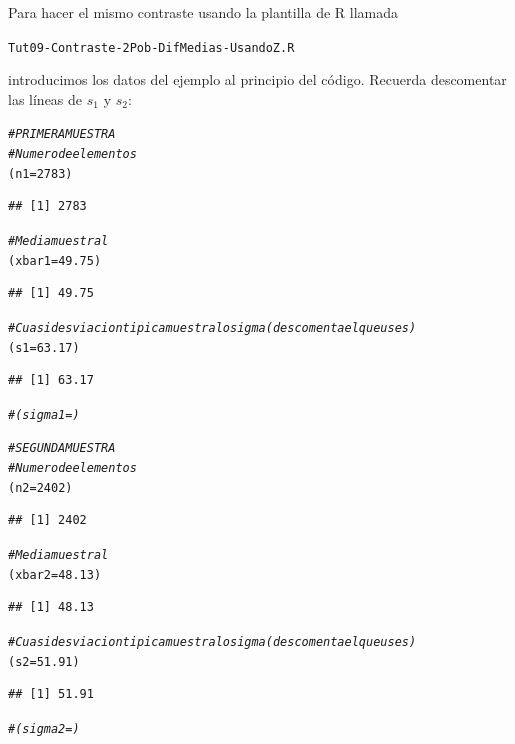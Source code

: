 \documentclass[10pt,a4paper]{article}\usepackage[]{graphicx}\usepackage[]{color}
\makeatletter
\newcommand{\hlnum}[1]{\textcolor[rgb]{0.686,0.059,0.569}{#1}}%
\newcommand{\hlcom}[1]{\textcolor[rgb]{0.678,0.584,0.686}{\textit{#1}}}%
\newcommand{\hlstd}[1]{\textcolor[rgb]{0.345,0.345,0.345}{#1}}%
\newcommand{\hlkwb}[1]{\textcolor[rgb]{0.69,0.353,0.396}{#1}}%
\newenvironment{kframe}{%
 \def\at@end@of@kframe{}%
 \ifinner\ifhmode%
  \def\at@end@of@kframe{\end{minipage}}%
  \begin{minipage}{\columnwidth}%
 \fi\fi%
 \def\FrameCommand##1{\hskip\@totalleftmargin \hskip-\fboxsep
 \colorbox{shadecolor}{##1}\hskip-\fboxsep
     \hskip-\linewidth \hskip-\@totalleftmargin \hskip\columnwidth}%
 \MakeFramed {\advance\hsize-\width
   \@totalleftmargin\z@ \linewidth\hsize
   \@setminipage}}%
 {\par\unskip\endMakeFramed%
 \at@end@of@kframe}
\newenvironment{knitrout}{}{} %
\newcounter {cont01}
\makeatother
\begin{document}
{\begin{enumerate}
    Para hacer el mismo contraste usando la plantilla de R llamada

     \begin{center}
     {\tt Tut09-Contraste-2Pob-DifMedias-UsandoZ.R}
     \end{center}
     introducimos los datos del ejemplo al principio del código. Recuerda descomentar las líneas de $s_1$ y $s_2$:
\begin{knitrout}
\color{fgcolor}\begin{kframe}
\begin{alltt}
  \hlcom{# PRIMERA MUESTRA}
  \hlcom{# Numero de elementos}
   \hlstd{(n1} \hlkwb{=} \hlnum{2783}\hlstd{)}
\end{alltt}
\begin{verbatim}
## [1] 2783
\end{verbatim}
\begin{alltt}
  \hlcom{# Media muestral}
   \hlstd{(xbar1} \hlkwb{=} \hlnum{49.75}\hlstd{)}
\end{alltt}
\begin{verbatim}
## [1] 49.75
\end{verbatim}
\begin{alltt}
  \hlcom{# Cuasidesviacion tipica muestral o sigma (descomenta el que uses)}
   \hlstd{(s1} \hlkwb{=} \hlnum{63.17}\hlstd{)}
\end{alltt}
\begin{verbatim}
## [1] 63.17
\end{verbatim}
\begin{alltt}
   \hlcom{#(sigma1 = )}


  \hlcom{# SEGUNDA MUESTRA}
  \hlcom{# Numero de elementos}
   \hlstd{(n2} \hlkwb{=} \hlnum{2402}\hlstd{)}
\end{alltt}
\begin{verbatim}
## [1] 2402
\end{verbatim}
\begin{alltt}
  \hlcom{# Media muestral}
   \hlstd{(xbar2} \hlkwb{=} \hlnum{48.13}\hlstd{)}
\end{alltt}
\begin{verbatim}
## [1] 48.13
\end{verbatim}
\begin{alltt}
  \hlcom{# Cuasidesviacion tipica muestral o sigma (descomenta el que uses)}
   \hlstd{(s2} \hlkwb{=} \hlnum{51.91}\hlstd{)}
\end{alltt}
\begin{verbatim}
## [1] 51.91
\end{verbatim}
\begin{alltt}
   \hlcom{#(sigma2 = )}


\end{alltt}
\end{kframe}
\end{knitrout}
\end{enumerate}}
\end{document}
